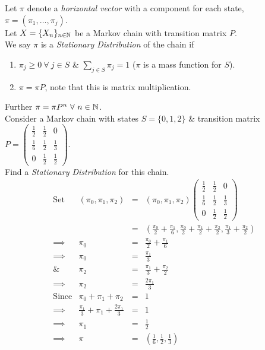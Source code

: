 \documentclass[11pt,a4paper]{article}
\begin{document}
Let $\pi$ denote a \textit{horizontal vector} with a component for each state, $\pi=(\pi_1,\dots,\pi_j)$.\\
Let $X=\{X_n\}_{n\in\mathbb{N}}$ be a Markov chain with transition matrix $P$.\\
We say $\pi$ is a \textit{Stationary Distribution} of the chain if
\begin{enumerate}
	\item $\pi_j\geq0\ \forall\ j\in S$ \& $\sum_{j\in S}\pi_j=1$ ($\pi$ is a mass function for $S$).
	\item $\pi=\pi P$, note that this is matrix multiplication.
\end{enumerate}
\nb Further $\pi=\pi P^n\ \forall\ n\in\nats$.\\

Consider a Markov chain with states $S=\{0,1,2\}$ \& transition matrix $P=\begin{pmatrix}\frac{1}{2}&\frac{1}{2}&0\\\frac{1}{6}&\frac{1}{2}&\frac{1}{3}\\0&\frac{1}{2}&\frac{1}{2}\end{pmatrix}$.\\
Find a \textit{Stationary Distribution} for this chain.
\[\begin{array}{rrcl}
\mathrm{Set}&(\pi_0,\pi_1,\pi_2)&=&(\pi_0,\pi_1,\pi_2)\begin{pmatrix}\frac{1}{2}&\frac{1}{2}&0\\\frac{1}{6}&\frac{1}{2}&\frac{1}{3}\\0&\frac{1}{2}&\frac{1}{2}\end{pmatrix}\\
&&=&(\frac{\pi_0}{2}+\frac{\pi_1}{6},\frac{\pi_0}{2}+\frac{\pi_1}{2}+\frac{\pi_2}{2},\frac{\pi_1}{3}+\frac{\pi_2}{2})\\
\implies&\pi_0&=&\frac{\pi_0}{2}+\frac{\pi_1}{6}\\
\implies&\pi_0&=&\frac{\pi_1}{3}\\
\&&\pi_2&=&\frac{\pi_1}{3}+\frac{\pi_2}{2}\\
\implies&\pi_2&=&\frac{2\pi_1}{3}\\
\mathrm{Since}&\pi_0+\pi_1+\pi_2&=&1\\
\implies&\frac{\pi_1}{3}+\pi_1+\frac{2\pi_1}{3}&=&1\\
\implies&\pi_1&=&\frac{1}{2}\\
\implies&\pi&=&(\frac{1}{6},\frac{1}{2},\frac{1}{3})
\end{array}\]
\end{document}

